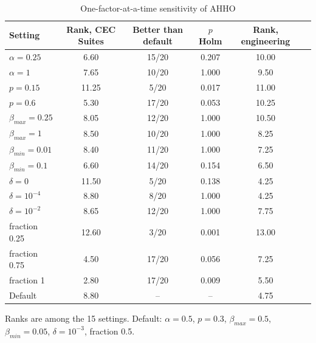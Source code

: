 \begin{table}[htbp]
\caption{One-factor-at-a-time sensitivity of AHHO}\label{tab:sensitivity}
\centering
\begin{tabular}{lccccc}
\toprule
Setting & Rank, CEC Suites & Better than default & $p$ Holm & Rank, engineering \\
\midrule
$\alpha=0.25$ & 6.60 & 15/20 & 0.207 & 10.00 \\
$\alpha=1$ & 7.65 & 10/20 & 1.000 & 9.50 \\
$p=0.15$ & 11.25 & 5/20 & 0.017 & 11.00 \\
$p=0.6$ & 5.30 & 17/20 & 0.053 & 10.25 \\
$\beta_{max}=0.25$ & 8.05 & 12/20 & 1.000 & 10.50 \\
$\beta_{max}=1$ & 8.50 & 10/20 & 1.000 & 8.25 \\
$\beta_{min}=0.01$ & 8.40 & 11/20 & 1.000 & 7.25 \\
$\beta_{min}=0.1$ & 6.60 & 14/20 & 0.154 & 6.50 \\
$\delta=0$ & 11.50 & 5/20 & 0.138 & 4.25 \\
$\delta=10^{-4}$ & 8.80 & 8/20 & 1.000 & 4.25 \\
$\delta=10^{-2}$ & 8.65 & 12/20 & 1.000 & 7.75 \\
fraction 0.25 & 12.60 & 3/20 & 0.001 & 13.00 \\
fraction 0.75 & 4.50 & 17/20 & 0.056 & 7.25 \\
fraction 1 & 2.80 & 17/20 & 0.009 & 5.50 \\
Default & 8.80 & -- & -- & 4.75 \\
\bottomrule
\end{tabular}
\vspace{2pt}

{\small Ranks are among the 15 settings. Default: $\alpha=0.5$, $p=0.3$, $\beta_{max}=0.5$, $\beta_{min}=0.05$, $\delta=10^{-3}$, fraction 0.5.}
\end{table}

